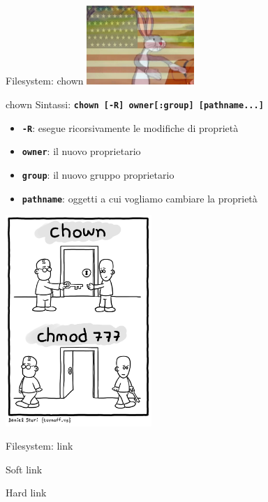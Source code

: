 \documentclass{beamer}
\begin{document}
    \begin{frame}{Filesystem: chown}
        \centering
        \includegraphics[height=3cm, keepaspectratio]{images/bugs-bunny-capitalist.png}
        \begin{block}{chown}
            \small
            Sintassi: \texttt{\textbf{chown [-R] owner[:group] [pathname...]}}

            \begin{itemize}
                \item \texttt{\textbf{-R}}: esegue ricorsivamente le modifiche di proprietà
                \item \texttt{\textbf{owner}}: il nuovo proprietario
                \item \texttt{\textbf{group}}: il nuovo gruppo proprietario
                \item \texttt{\textbf{pathname}}: oggetti a cui vogliamo cambiare la proprietà
            \end{itemize}
        \end{block}
    \end{frame}

    \begin{frame}{}
        \centering
        \includegraphics[height=8cm, keepaspectratio]{images/chown-chmod.png}
    \end{frame}

    \begin{frame}{Filesystem: link}
        \begin{block}{Soft link}
            \small
        \end{block}

        \begin{block}{Hard link}
            \small
        \end{block}
    \end{frame}
\end{document}
